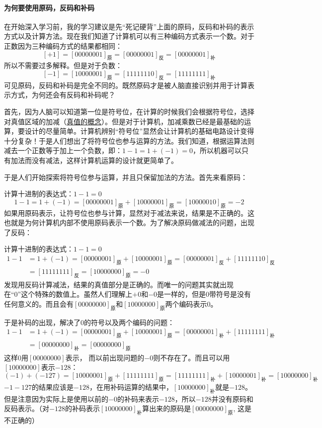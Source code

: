 \paragraph*{为何要使用原码，反码和补码}
在开始深入学习前，我的学习建议是先“死记硬背”上面的原码，反码和补码的表示方式以及计算方法。现在我们知道了计算机可以有三种编码方式表示一个数。对于正数因为三种编码方式的结果都相同：
$$[+1]=[00000001]_{\textrm{原}}=[00000001]_{\textrm{反}}=[00000001]_{\textrm{补}}$$
所以不需要过多解释。但是对于负数：
$$[-1]=[10000001]_{\textrm{原}}=[11111110]_{\textrm{反}}=[11111111]_{\textrm{补}}$$
可见原码，反码和补码是完全不同的。既然原码才是被人脑直接识别并用于计算表示方式，为何还会有反码和补码呢？

首先，因为人脑可以知道第一位是符号位，在计算的时候我们会根据符号位，选择对真值区域的加减（\hyperref[sec6]{真值的概念}）。但是对于计算机，加减乘数已经是最基础的运算，要设计的尽量简单。计算机辨别“符号位”显然会让计算机的基础电路设计变得十分复杂！于是人们想出了将符号位也参与运算的方法。我们知道，根据运算法则减去一个正数等于加上一个负数，即：$1-1=1+(-1)=0$，所以机器可以只有加法而没有减法，这样计算机运算的设计就更简单了。

于是人们开始探索将符号位参与运算，并且只保留加法的方法。首先来看原码：

计算十进制的表达式：$1-1=0$
$$1-1=1+(-1)=[00000001]_{\textrm{原}}+[10000001]_{\textrm{原}}=[10000010]_{\textrm{原}}=-2$$
如果用原码表示，让符号位也参与计算，显然对于减法来说，结果是不正确的。这也就是为何计算机内部不使用原码表示一个数。为了解决原码做减法的问题，出现了反码：

计算十进制的表达式：$1-1=0$
\[\begin{split}
1-1&=1+(-1)=[00000001]_{\textrm{原}}+[10000001]_{\textrm{原}}=[00000001]_{\textrm{反}}+[11111110]_{\textrm{反}}\\
&=[11111111]_{\textrm{反}}=[10000000]_{\textrm{原}}=-0
\end{split}\]
发现用反码计算减法，结果的真值部分是正确的。而唯一的问题其实就出现在“0”这个特殊的数值上。虽然人们理解上$+0$和$-0$是一样的，但是0带符号是没有任何意义的。而且会有$[00000000]_{\textrm{原}}$和$[10000000]_{\textrm{原}}$两个编码表示0。

于是补码的出现，解决了0的符号以及两个编码的问题：
\[\begin{split}
1-1&=1+(-1)=[00000001]_{\textrm{原}}+[10000001]_{\textrm{原}}=[00000001]_{\textrm{补}}+[11111111]_{\textrm{补}}\\
&=[00000000]_{\textrm{补}}=[00000000]_{\textrm{原}}
\end{split}\]
这样0用$[00000000]$表示， 而以前出现问题的$-0$则不存在了。而且可以用$[10000000]$表示$-128$：
$$(-1)+(-127)=[10000001]_{\textrm{原}}+[11111111]_{\textrm{原}}=[11111111]_{\textrm{补}}+[10000001]_{\textrm{补}}=[10000000]_{\textrm{补}}$$
$-1-127$的结果应该是$-128$，在用补码运算的结果中，$[1000 0000]_{\textrm{补}}$就是$-128$。但是注意因为实际上是使用以前的$-0$的补码来表示$-128$，所以$-128$并没有原码和反码表示。（对$-128$的补码表示$[10000000]_{\textrm{补}}$算出来的原码是$[0000 0000]_{\textrm{原}}$, 这是不正确的）

